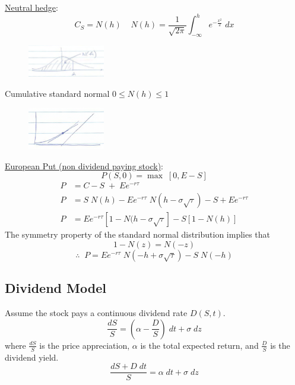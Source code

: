 \documentclass[
14pt,notheorems,hyperref={pdfauthor=whatever}
]{beamer}
\begin{document}
\begin{frame}
\underline{Neutral hedge}:
\[C_S = N(h) \;\;\;\; N(h) = \frac{1}{\sqrt{2\pi}}\int_{-\infty}^h e^{-\frac{x^2}{2}}\;dx\]
\begin{figure}[neutral-hedge1]
    \includegraphics[width=0.3\textwidth]{images/L14-nh1.png}
    \centering
\end{figure}
Cumulative standard normal $0 \leq N(h) \leq 1$
\begin{figure}[neutral-hedge2]
    \includegraphics[width=0.3\textwidth]{images/L14-nh2.png}
    \centering
\end{figure}
\end{frame}

\begin{frame}
\underline{European Put (non dividend paying stock)}:\\
\[P(S,0) = \max\;[0,E-S]\]
\begin{align*}
    P &= C-S\;+\;E e^{-r\tau}\\
    P &= S\;N(h)-E e^{-r\tau}\;N(h-\sigma\sqrt{\tau})-S+E e^{-r\tau}\\
    P &= E e^{-r\tau} [1-N(h-\sigma\sqrt{\tau}]-S[1-N(h)]
\end{align*}
The symmetry property of the standard normal distribution implies that\\
\[1-N(z) = N(-z)\]
\[\therefore \;\; P = E e^{-r\tau}\;N(-h+\sigma\sqrt{\tau})-S\;N(-h)\]
\end{frame}

\subsection{Dividend Model}
\begin{frame}
Assume the stock pays a continuous dividend rate $D(S,t)$.\\
\[ \frac{dS}{S} = (\alpha - \frac{D}{S})\;dt+\sigma\;dz\]
where $\frac{dS}{S}$ is the price appreciation, $\alpha$ is the total expected return, and $\frac{D}{S}$ is the dividend yield.\\
\[ \frac{dS+D\;dt}{S} = \alpha\;dt+\sigma\;dz\]
\end{frame}
\end{document}
